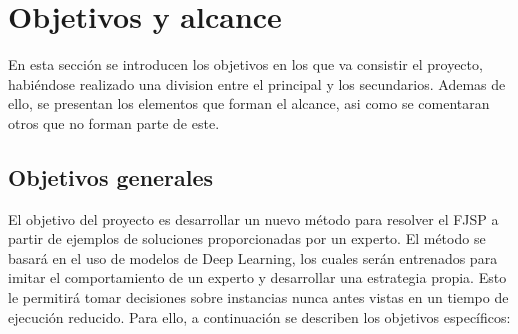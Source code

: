 \section{Objetivos y alcance}
En esta sección se introducen los objetivos en los que va consistir el
proyecto, habiéndose realizado una division entre el principal y los
secundarios. Ademas de ello, se presentan los elementos que forman el alcance,
asi como se comentaran otros que no forman parte de este.

\subsection{Objetivos generales}
El objetivo del proyecto es desarrollar un nuevo método para resolver el FJSP a
partir de ejemplos de soluciones proporcionadas por un experto. El método se
basará en el uso de modelos de Deep Learning, los cuales serán entrenados para
imitar el comportamiento de un experto y desarrollar una estrategia propia.
Esto le permitirá tomar decisiones sobre instancias nunca antes vistas en un
tiempo de ejecución reducido. Para ello, a continuación se describen los
objetivos específicos:

